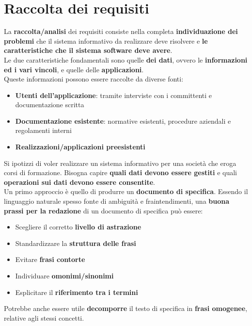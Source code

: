 \documentclass{article}
\begin{document}
\pagestyle{empty}

\section*{Raccolta dei requisiti} 
\large

La \textbf{raccolta/analisi} dei requisiti consiste nella completa \textbf{individuazione dei problemi} che il sistema informativo da realizzare deve risolvere e \textbf{le caratteristiche che il sistema software deve avere}.\\
Le due caratteristiche fondamentali sono quelle \textbf{dei dati}, ovvero le \textbf{informazioni ed i vari vincoli}, e quelle delle \textbf{applicazioni}.\\
Queste informazioni possono essere raccolte da diverse fonti:
\begin{itemize}[label={-}, leftmargin=1cm]
    \itemsep0em
    \item \textbf{Utenti dell'applicazione}: tramite interviste con i committenti e documentazione scritta
    \item \textbf{Documentazione esistente}: normative esistenti, procedure aziendali e regolamenti interni
    \item \textbf{Realizzazioni/applicazioni preesistenti}\\
\end{itemize}
Si ipotizzi di voler realizzare un sistema informativo per una società che eroga corsi di formazione. Bisogna capire \textbf{quali dati devono essere gestiti} e quali \textbf{operazioni sui dati devono essere consentite}.\\
Un primo approccio è quello di produrre un \textbf{documento di specifica}. Essendo il linguaggio naturale spesso fonte di ambiguità e fraintendimenti, una \textbf{buona prassi per la redazione} di un documento di specifica può essere:
\begin{itemize}[label={-}, leftmargin=1cm]
    \itemsep0em
    \item Scegliere il corretto \textbf{livello di astrazione}
    \item Standardizzare la \textbf{struttura delle frasi}
    \item Evitare \textbf{frasi contorte}
    \item Individuare \textbf{omonimi/sinonimi}
    \item Esplicitare il \textbf{riferimento tra i termini}
\end{itemize}
Potrebbe anche essere utile \textbf{decomporre} il testo di specifica in \textbf{frasi omogenee}, relative agli stessi concetti.\vspace*{14pt}\\
\end{document}
